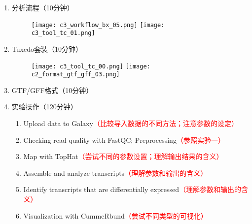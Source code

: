 \documentclass{TIJMUjiaoanSY}
\begin{document}

\firstTail


\newpage
\otherHeader

\noindent
\begin{enumerate}
  \item 分析流程（10分钟）
    \begin{figure}[ht]
      \centering
      \texttt{[image: c3\_workflow\_bx\_05.png]}
      \hspace{2em}
      \texttt{[image: c3\_tool\_tc\_01.png]}
    \end{figure}

  \item Tuxedo套装（10分钟）
    \begin{figure}[ht]
      \centering
      \texttt{[image: c3\_tool\_tc\_00.png]}
      \hspace{2em}
      \texttt{[image: c2\_format\_gtf\_gff\_03.png]}
    \end{figure}

  \item GTF/GFF格式（10分钟）

  \item 实验操作（120分钟）
    \begin{enumerate}
      \item Upload data to Galaxy\textcolor{red}{（比较导入数据的不同方法；注意参数的设定）}
      \item Checking read quality with FastQC; Preprocessing\textcolor{red}{（参照实验一）}
      \item Map with TopHat\textcolor{red}{（尝试不同的参数设置；理解输出结果的含义）}
      \item Assemble and analyze transcripts\textcolor{red}{（理解参数和输出的含义）}
      \item Identify transcripts that are differentially expressed\textcolor{red}{（理解参数和输出的含义）}
      \item Visualization with CummeRbund\textcolor{red}{（尝试不同类型的可视化）}
    \end{enumerate}
\end{enumerate}


\otherTail
\end{document}
